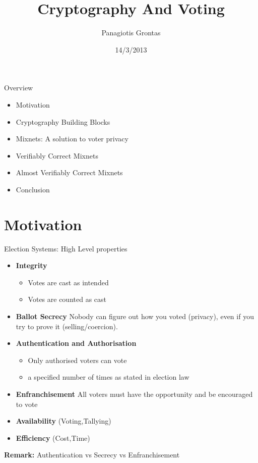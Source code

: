 \documentclass{beamer}
\title{Cryptography And Voting}
\author{Panagiotis Grontas}
\date{14/3/2013}
\institute{$\mu \Pi \lambda \forall$}
\newcommand*{\addsp}{\usebeamertemplate*{section page1}}
\begin{document}
\begin{frame}
\titlepage
\end{frame}

\begin{frame}{Overview}
\begin{itemize}
\item Motivation
\item Cryptography Building Blocks
\item Mixnets: A solution to voter privacy
\item Verifiably Correct Mixnets
\item Almost Verifiably Correct Mixnets
\item Conclusion
\end{itemize}
\end{frame}

\section{Motivation}

\begin{frame}
\addsp
\end{frame}

\begin{frame}{Election Systems: High Level properties}
\begin{itemize}
\item \textbf{Integrity}
\begin{itemize}
	\item Votes are cast as intended
	\item Votes are counted as cast
\end{itemize}
\item \textbf{Ballot Secrecy} Nobody can figure out how you voted (privacy), even if you try to prove it (selling/coercion).
\item \textbf{Authentication and Authorisation}
\begin{itemize}
	\item Only authorised voters can vote
	\item a specified number of times as stated in election law
\end{itemize}
\item \textbf{Enfranchisement} All voters must have the opportunity and be encouraged to vote
\item \textbf{Availability} (Voting,Tallying)
\item \textbf{Efficiency} (Cost,Time)
\end{itemize}
\textbf{Remark: } Authentication vs Secrecy vs Enfranchisement
\end{frame} 
\end{document}
